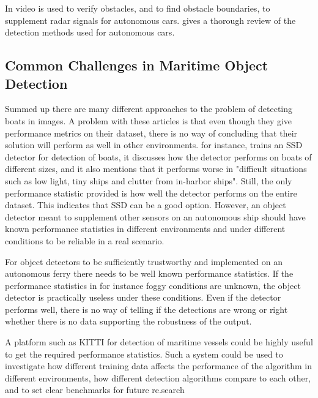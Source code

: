 \vspace{3mm}

In \citep{Wedel2007} video is used to verify obstacles, and to find obstacle boundaries, to supplement radar signals for autonomous cars. \citep{Sun2006} gives a thorough review of the detection methods used for autonomous cars. 


\subsection{Common Challenges in Maritime Object Detection}
Summed up there are many different approaches to the problem of detecting boats in images. A problem with these articles is that even though they give performance metrics on their dataset, there is no way of concluding that their solution will perform as well in other environments. \citep{SSD_detection2018} for instance, trains an SSD detector for detection of boats, it discusses how the detector performs on boats of different sizes, and it also mentions that it performs worse in "difficult situations such as low light, tiny ships and clutter from in-harbor ships". Still, the only performance statistic provided is how well the detector performs on the entire dataset. This indicates that SSD can be a good option. However, an object detector meant to supplement other sensors on an autonomous ship should have known performance statistics in different environments and under different conditions to be reliable in a real scenario. 

\vspace{3mm}

For object detectors to be sufficiently trustworthy and implemented on an autonomous ferry there needs to be well known performance statistics. If the performance statistics in for instance foggy conditions are unknown, the object detector is practically useless under these conditions. Even if the detector performs well, there is no way of telling if the detections are wrong or right whether there is no data supporting the robustness of the output.

\vspace{3mm}

A platform such as KITTI \citep{KITTI} for detection of maritime vessels could be highly useful to get the required performance statistics. Such a system could be used to investigate how different training data affects the performance of the algorithm in different environments, how different detection algorithms compare to each other, and to set clear benchmarks for future re.search



\cleardoublepage